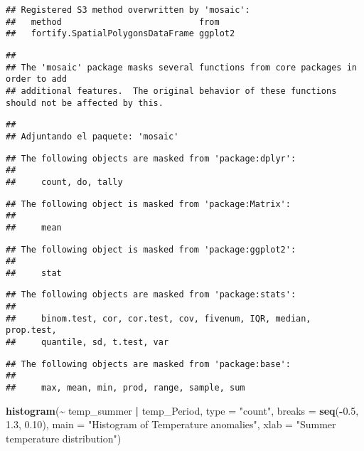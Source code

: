 \documentclass[
]{article}
\newenvironment{Shaded}{\begin{snugshade}}{\end{snugshade}}
\newcommand{\AttributeTok}[1]{\textcolor[rgb]{0.13,0.29,0.53}{#1}}
\newcommand{\FloatTok}[1]{\textcolor[rgb]{0.00,0.00,0.81}{#1}}
\newcommand{\FunctionTok}[1]{\textcolor[rgb]{0.13,0.29,0.53}{\textbf{#1}}}
\newcommand{\NormalTok}[1]{#1}
\newcommand{\SpecialCharTok}[1]{\textcolor[rgb]{0.81,0.36,0.00}{\textbf{#1}}}
\newcommand{\StringTok}[1]{\textcolor[rgb]{0.31,0.60,0.02}{#1}}
\begin{document}
\begin{verbatim}
## Registered S3 method overwritten by 'mosaic':
##   method                           from   
##   fortify.SpatialPolygonsDataFrame ggplot2
\end{verbatim}

\begin{verbatim}
## 
## The 'mosaic' package masks several functions from core packages in order to add 
## additional features.  The original behavior of these functions should not be affected by this.
\end{verbatim}

\begin{verbatim}
## 
## Adjuntando el paquete: 'mosaic'
\end{verbatim}

\begin{verbatim}
## The following objects are masked from 'package:dplyr':
## 
##     count, do, tally
\end{verbatim}

\begin{verbatim}
## The following object is masked from 'package:Matrix':
## 
##     mean
\end{verbatim}

\begin{verbatim}
## The following object is masked from 'package:ggplot2':
## 
##     stat
\end{verbatim}

\begin{verbatim}
## The following objects are masked from 'package:stats':
## 
##     binom.test, cor, cor.test, cov, fivenum, IQR, median, prop.test,
##     quantile, sd, t.test, var
\end{verbatim}

\begin{verbatim}
## The following objects are masked from 'package:base':
## 
##     max, mean, min, prod, range, sample, sum
\end{verbatim}

\begin{Shaded}
\begin{Highlighting}[]
\FunctionTok{histogram}\NormalTok{(}\SpecialCharTok{\textasciitilde{}}\NormalTok{ temp\_summer }\SpecialCharTok{|}\NormalTok{ temp\_Period, }\AttributeTok{type =} \StringTok{"count"}\NormalTok{, }
  \AttributeTok{breaks =} \FunctionTok{seq}\NormalTok{(}\SpecialCharTok{{-}}\FloatTok{0.5}\NormalTok{, }\FloatTok{1.3}\NormalTok{, }\FloatTok{0.10}\NormalTok{), }
  \AttributeTok{main =} \StringTok{"Histogram of Temperature anomalies"}\NormalTok{, }
  \AttributeTok{xlab =} \StringTok{"Summer temperature distribution"}\NormalTok{)}
\end{Highlighting}
\end{Shaded}
\end{document}

